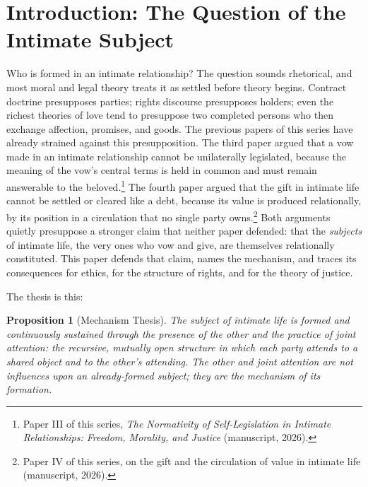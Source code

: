 \documentclass[11pt,a4paper]{article}
\theoremstyle{seriesthm}
\newtheorem{prop}{Proposition}
\begin{document}
\begin{titlepage}
\begin{center}
\begin{minipage}{0.92\textwidth}
{\par}
\end{minipage}
\end{center}
\end{titlepage}

\newpage
\tableofcontents
\newpage

\section{Introduction: The Question of the Intimate Subject}

Who is formed in an intimate relationship? The question sounds rhetorical, and most moral and legal theory treats it as settled before theory begins. Contract doctrine presupposes parties; rights discourse presupposes holders; even the richest theories of love tend to presuppose two completed persons who then exchange affection, promises, and goods. The previous papers of this series have already strained against this presupposition. The third paper argued that a vow made in an intimate relationship cannot be unilaterally legislated, because the meaning of the vow's central terms is held in common and must remain answerable to the beloved.\footnote{Paper III of this series, \emph{The Normativity of Self-Legislation in Intimate Relationships: Freedom, Morality, and Justice} (manuscript, 2026).} The fourth paper argued that the gift in intimate life cannot be settled or cleared like a debt, because its value is produced relationally, by its position in a circulation that no single party owns.\footnote{Paper IV of this series, on the gift and the circulation of value in intimate life (manuscript, 2026).} Both arguments quietly presuppose a stronger claim that neither paper defended: that the \emph{subjects} of intimate life, the very ones who vow and give, are themselves relationally constituted. This paper defends that claim, names the mechanism, and traces its consequences for ethics, for the structure of rights, and for the theory of justice.

The thesis is this:

\begin{prop}[Mechanism Thesis]\label{p05:prop:mechanism}
The subject of intimate life is formed and continuously sustained through the presence of the other and the practice of joint attention: the recursive, mutually open structure in which each party attends to a shared object and to the other's attending. The other and joint attention are not influences upon an already-formed subject; they are the mechanism of its formation.
\end{prop}
\end{document}
